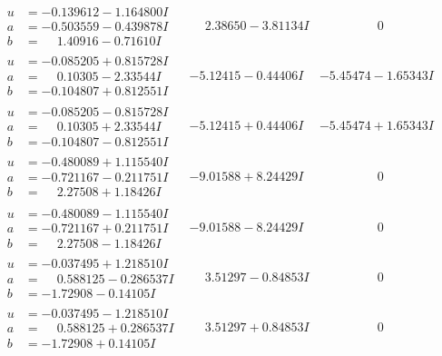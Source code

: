 \documentclass[1p]{elsarticle_modified}
\theoremstyle{definition}
\begin{document}
$$\begin{array}{c|c|c}
\begin{aligned}
u &= -0.139612 - 1.164800 I \\
a &= -0.503559 - 0.439878 I \\
b &= \phantom{-}1.40916 - 0.71610 I\end{aligned}
 & \phantom{-}2.38650 - 3.81134 I & \phantom{-0.000000 } 0 \\ \hline\begin{aligned}
u &= -0.085205 + 0.815728 I \\
a &= \phantom{-}0.10305 - 2.33544 I \\
b &= -0.104807 + 0.812551 I\end{aligned}
 & -5.12415 - 0.44406 I & -5.45474 - 1.65343 I \\ \hline\begin{aligned}
u &= -0.085205 - 0.815728 I \\
a &= \phantom{-}0.10305 + 2.33544 I \\
b &= -0.104807 - 0.812551 I\end{aligned}
 & -5.12415 + 0.44406 I & -5.45474 + 1.65343 I \\ \hline\begin{aligned}
u &= -0.480089 + 1.115540 I \\
a &= -0.721167 - 0.211751 I \\
b &= \phantom{-}2.27508 + 1.18426 I\end{aligned}
 & -9.01588 + 8.24429 I & \phantom{-0.000000 } 0 \\ \hline\begin{aligned}
u &= -0.480089 - 1.115540 I \\
a &= -0.721167 + 0.211751 I \\
b &= \phantom{-}2.27508 - 1.18426 I\end{aligned}
 & -9.01588 - 8.24429 I & \phantom{-0.000000 } 0 \\ \hline\begin{aligned}
u &= -0.037495 + 1.218510 I \\
a &= \phantom{-}0.588125 - 0.286537 I \\
b &= -1.72908 - 0.14105 I\end{aligned}
 & \phantom{-}3.51297 - 0.84853 I & \phantom{-0.000000 } 0 \\ \hline\begin{aligned}
u &= -0.037495 - 1.218510 I \\
a &= \phantom{-}0.588125 + 0.286537 I \\
b &= -1.72908 + 0.14105 I\end{aligned}
 & \phantom{-}3.51297 + 0.84853 I & \phantom{-0.000000 } 0 \\ \hline\begin{aligned}

\end{aligned}
\end{array}$$
\end{document}
